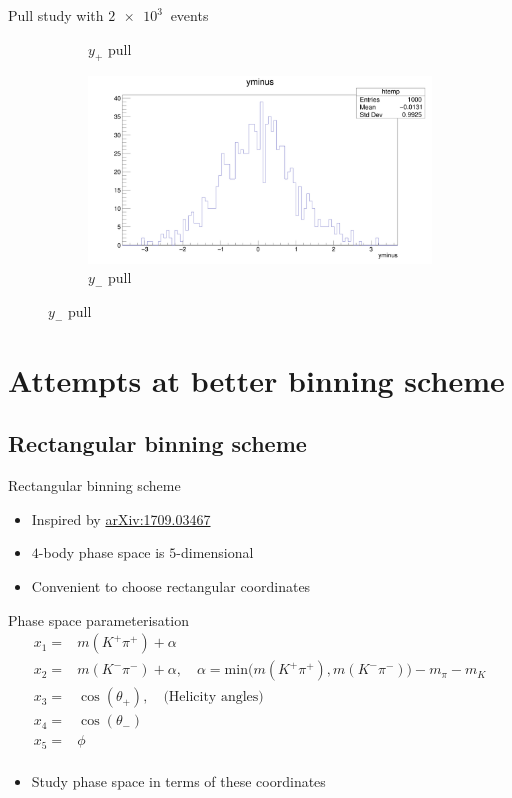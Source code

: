 \documentclass{beamer}
\begin{document}
\begin{frame}{Pull study with $\SI{2e3}{}$ events}
\begin{figure}
\begin{subfigure}{0.5\textwidth}
      \caption{$y_+$ pull}
    \end{subfigure}%
    \begin{subfigure}{0.5\textwidth}
      \includegraphics[width = 1.0\textwidth]{NaivePulls/yminus1K1K.png}
      \caption{$y_-$ pull}
    \end{subfigure}
  \end{figure}
\end{frame}

\section{Attempts at better binning scheme}
\subsection{Rectangular binning scheme}
\begin{frame}{Rectangular binning scheme}
  \begin{itemize}
    \item{Inspired by \href{https://arxiv.org/abs/1709.03467}{arXiv:1709.03467}}
    \item{$4$-body phase space is $5$-dimensional}
    \item{Convenient to choose rectangular coordinates}
  \end{itemize}
  \begin{block}{Phase space parameterisation}
    \begin{align*}
      x_1 =& m(K^+\pi^+) + \alpha \\
      x_2 =& m(K^-\pi^-) + \alpha, \quad \alpha = \text{min}\big(m(K^+\pi^+), m(K^-\pi^-)\big) - m_\pi - m_K \\
      x_3 =& \cos(\theta_+), \quad \text{(Helicity angles)} \\
      x_4 =& \cos(\theta_-) \\
      x_5 =& \phi \\
    \end{align*}
  \end{block}
  \begin{itemize}
    \item{Study phase space in terms of these coordinates}
  \end{itemize}
\end{frame}
\end{document}
